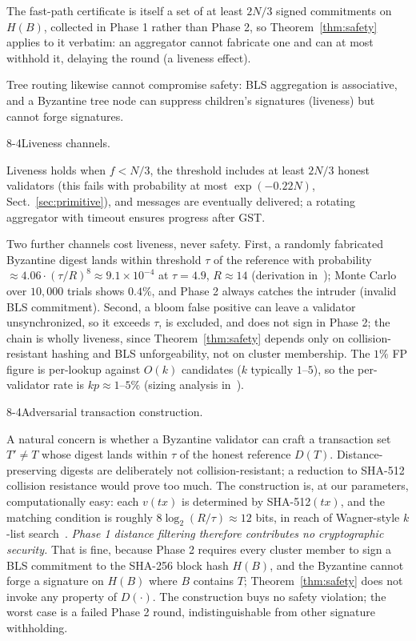 \documentclass[runningheads]{llncs}
\makeatletter
\renewcommand\paragraph{\@startsection{paragraph}{4}{\z@}%
  {8\p@ \@plus 2\p@ \@minus 2\p@}{-4\p@}{\normalfont\normalsize\bfseries\boldmath}}
\makeatother
\begin{document}
The fast-path certificate is itself a set of at least $2N/3$ signed commitments on $H(B)$, collected in Phase 1 rather than Phase 2, so Theorem~\ref{thm:safety} applies to it verbatim: an aggregator cannot fabricate one and can at most withhold it, delaying the round (a liveness effect).

Tree routing likewise cannot compromise safety: BLS aggregation is associative, and a Byzantine tree node can suppress children's signatures (liveness) but cannot forge signatures.

\paragraph{Liveness channels.}
\label{sec:liveness}

Liveness holds when $f < N/3$, the threshold includes at least $2N/3$ honest validators (this fails with probability at most $\exp(-0.22 N)$, Sect.~\ref{sec:primitive}), and messages are eventually delivered; a rotating aggregator with timeout ensures progress after GST.

 Two further channels cost liveness, never safety. First, a randomly fabricated Byzantine digest lands within threshold $\tau$ of the reference with probability $\approx 4.06 \cdot (\tau / R)^8 \approx 9.1 \times 10^{-4}$ at $\tau = 4.9$, $R \approx 14$ (derivation in~\cite{proxima-tr}); Monte Carlo over $10{,}000$ trials shows $0.4\%$, and Phase 2 always catches the intruder (invalid BLS commitment). Second, a bloom false positive can leave a validator unsynchronized, so it exceeds $\tau$, is excluded, and does not sign in Phase 2; the chain is wholly liveness, since Theorem~\ref{thm:safety} depends only on collision-resistant hashing and BLS unforgeability, not on cluster membership. The $1\%$ FP figure is per-lookup against $O(k)$ candidates ($k$ typically $1$--$5$), so the per-validator rate is $kp \approx 1$--$5\%$ (sizing analysis in~\cite{proxima-tr}).

\paragraph{Adversarial transaction construction.}
\label{sec:adversarial}

 A natural concern is whether a Byzantine validator can craft a transaction set $T' \ne T$ whose digest lands within $\tau$ of the honest reference $D(T)$. Distance-preserving digests are deliberately not collision-resistant; a reduction to SHA-512 collision resistance would prove too much. The construction is, at our parameters, computationally easy: each $v(tx)$ is determined by SHA-512$(tx)$, and the matching condition is roughly $8 \log_2(R/\tau) \approx 12$ bits, in reach of Wagner-style $k$-list search~\cite{wagner2002gbp}. \emph{Phase 1 distance filtering therefore contributes no cryptographic security.} That is fine, because Phase 2 requires every cluster member to sign a BLS commitment to the SHA-256 block hash $H(B)$, and the Byzantine cannot forge a signature on $H(B)$ where $B$ contains $T$; Theorem~\ref{thm:safety} does not invoke any property of $D(\cdot)$. The construction buys no safety violation; the worst case is a failed Phase 2 round, indistinguishable from other signature withholding.
\end{document}
